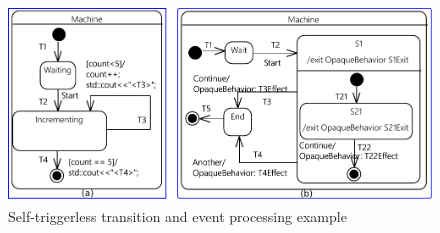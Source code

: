 \begin{figure}
\centering
\includegraphics[clip, trim=0cm 0cm 0cm 0cm, width=\columnwidth]{figures/Deferred004Revised}
\caption{Self-triggerless transition and event processing example} 
\label{fig:autotransition}
\end{figure}


